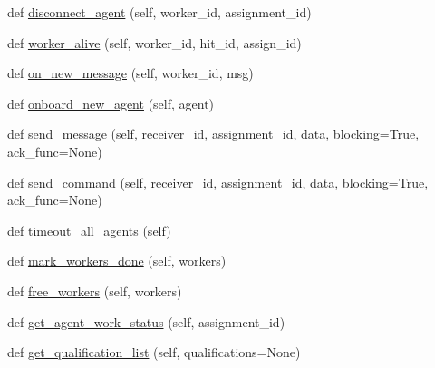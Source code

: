 \begin{DoxyCompactItemize}
\item 
def \hyperlink{classparlai_1_1mturk_1_1webapp_1_1run__mocks_1_1mock__turk__manager_1_1MockTurkManager_a166076ddd60ec3ab7bf0845aff2875d2}{disconnect\+\_\+agent} (self, worker\+\_\+id, assignment\+\_\+id)
\item 
def \hyperlink{classparlai_1_1mturk_1_1webapp_1_1run__mocks_1_1mock__turk__manager_1_1MockTurkManager_a0de1a403e413421953de31fcb9033d8f}{worker\+\_\+alive} (self, worker\+\_\+id, hit\+\_\+id, assign\+\_\+id)
\item 
def \hyperlink{classparlai_1_1mturk_1_1webapp_1_1run__mocks_1_1mock__turk__manager_1_1MockTurkManager_a22ec87467bf13a9c44ad6c138a353ff4}{on\+\_\+new\+\_\+message} (self, worker\+\_\+id, msg)
\item 
def \hyperlink{classparlai_1_1mturk_1_1webapp_1_1run__mocks_1_1mock__turk__manager_1_1MockTurkManager_a16e055d5b5f244e0e53cda2d9225b487}{onboard\+\_\+new\+\_\+agent} (self, agent)
\item 
def \hyperlink{classparlai_1_1mturk_1_1webapp_1_1run__mocks_1_1mock__turk__manager_1_1MockTurkManager_a26e2b49cb461535a059fb6d544a8eaab}{send\+\_\+message} (self, receiver\+\_\+id, assignment\+\_\+id, data, blocking=True, ack\+\_\+func=None)
\item 
def \hyperlink{classparlai_1_1mturk_1_1webapp_1_1run__mocks_1_1mock__turk__manager_1_1MockTurkManager_a986d0bdeec4969b35e47c0766c3db571}{send\+\_\+command} (self, receiver\+\_\+id, assignment\+\_\+id, data, blocking=True, ack\+\_\+func=None)
\item 
def \hyperlink{classparlai_1_1mturk_1_1webapp_1_1run__mocks_1_1mock__turk__manager_1_1MockTurkManager_a5020c2bf9d09d8173feb073e9b9aa929}{timeout\+\_\+all\+\_\+agents} (self)
\item 
def \hyperlink{classparlai_1_1mturk_1_1webapp_1_1run__mocks_1_1mock__turk__manager_1_1MockTurkManager_a20099e3edc6cc8060559d2c96363e104}{mark\+\_\+workers\+\_\+done} (self, workers)
\item 
def \hyperlink{classparlai_1_1mturk_1_1webapp_1_1run__mocks_1_1mock__turk__manager_1_1MockTurkManager_a0c7a7f4b1df62cfd110ecaadcfd0b69b}{free\+\_\+workers} (self, workers)
\item 
def \hyperlink{classparlai_1_1mturk_1_1webapp_1_1run__mocks_1_1mock__turk__manager_1_1MockTurkManager_a4b1f1a7312951c6756cb6d491840dea8}{get\+\_\+agent\+\_\+work\+\_\+status} (self, assignment\+\_\+id)
\item 
def \hyperlink{classparlai_1_1mturk_1_1webapp_1_1run__mocks_1_1mock__turk__manager_1_1MockTurkManager_a54fefa6a8fbd69f12f8ed7c3728c7c34}{get\+\_\+qualification\+\_\+list} (self, qualifications=None)

\end{DoxyCompactItemize}
